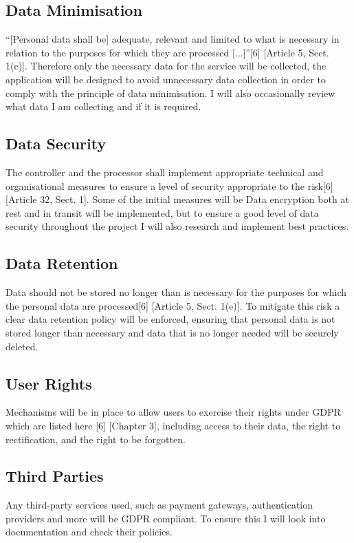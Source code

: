 \documentclass[]{project_report}
\begin{document}
\subsection{Data Minimisation}
“[Personal data shall be] adequate, relevant and limited to what is necessary in relation to the purposes for which they are processed [...]”[6] [Article 5, Sect. 1(c)]. Therefore only the necessary data for the service will be collected, the application will be designed to avoid unnecessary data collection in order to comply with the principle of data minimisation. I will also occasionally review what data I am collecting and if it is required.

\subsection{Data Security}
The controller and the processor shall implement appropriate technical and organisational measures to ensure a level of security appropriate to the risk[6] [Article 32, Sect. 1]. Some of the initial measures will be Data encryption both at rest and in transit will be implemented, but to ensure a good level of data security throughout the project I will also research and implement best practices.

\subsection{Data Retention}
Data should not be stored no longer than is necessary for the purposes for which the personal data are processed[6] [Article 5, Sect. 1(e)]. To mitigate this risk a clear data retention policy will be enforced, ensuring that personal data is not stored longer than necessary and data that is no longer needed will be securely deleted.

\subsection{User Rights}
Mechanisms will be in place to allow users to exercise their rights under GDPR which are listed here [6] [Chapter 3], including access to their data, the right to rectification, and the right to be forgotten.

\subsection{Third Parties}
Any third-party services used, such as payment gateways, authentication providers and more will be GDPR compliant. To ensure this I will look into documentation and check their policies.\newline
\end{document}
